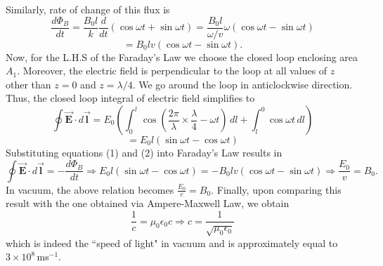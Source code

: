 \documentclass{article}
\begin{document}
Similarly, rate of change of this flux is
\[\frac{d\Phi_B}{dt}=\frac{B_0l}{k}\frac{d}{dt}(\cos\omega t+\sin\omega t)=\frac{B_0l}{\omega/v}\omega(\cos\omega t-\sin\omega t)\]
\begin{equation}
    =B_0lv(\cos\omega t-\sin\omega t).
\end{equation}
Now, for the L.H.S of the Faraday's Law we choose the closed loop enclosing area $A_1$. Moreover, the electric field is perpendicular to the loop at all values of $z$ other than $z=0$ and $z=\lambda/4$. We go around the loop in anticlockwise direction. Thus, the closed loop integral of electric field simplifies to
\[\oint\boldsymbol{\vec{E}}\cdot d\boldsymbol{\vec{l}}=E_0\left(\int_{0}^{l}\cos\left(\frac{2\pi}{\lambda}\times\frac{\lambda}{4}-\omega t\right)\,dl+\int_{l}^{0}\cos\omega t\,dl\right)\]
\begin{equation}
    =E_0l(\sin\omega t-\cos\omega t)
\end{equation}
Substituting equations (1) and (2) into Faraday's Law results in
\[\oint\boldsymbol{\vec{E}}\cdot d\boldsymbol{\vec{l}}=-\frac{d\Phi_B}{dt}\Rightarrow E_0l(\sin\omega t-\cos\omega t)=-B_0lv(\cos\omega t-\sin\omega t)\Rightarrow \frac{E_0}{v}=B_0.\]
In vacuum, the above relation becomes $\frac{E_0}{c}=B_0$. Finally, upon comparing this result with the one obtained via Ampere-Maxwell Law, we obtain
\[\frac{1}{c}=\mu_0\epsilon_0c\Rightarrow c=\frac{1}{\sqrt{\mu_0\epsilon_0}}\]
which is indeed the “speed of light" in vacuum and is approximately equal to $3\times10^8\,$ms$^{-1}$.
\end{document}
